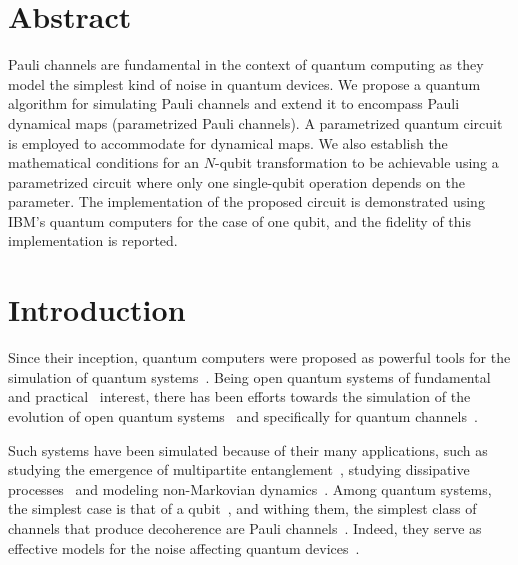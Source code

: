 \documentclass[10pt,letterpaper]{article} %
\begin{document}
\section*{Abstract}
Pauli channels are fundamental in the context of quantum computing as they
model the simplest kind of noise in quantum devices.  We propose a quantum
algorithm for simulating
Pauli channels 
and extend it to encompass Pauli dynamical maps 
(parametrized Pauli channels).
A parametrized quantum circuit is employed to accommodate for dynamical maps. 
We also establish the mathematical conditions for an
$N$-qubit transformation to be achievable using a parametrized circuit where
only one single-qubit operation depends on the parameter. 
The implementation of the proposed circuit is demonstrated using IBM's quantum computers 
for the case of one qubit, and the fidelity of this implementation is reported. 


\section{Introduction} %

Since their inception, quantum computers were proposed as powerful tools for
the simulation of quantum systems~\cite{feynman1982simulating}.  Being open
quantum systems of fundamental~\cite{Zur91,RevModPhys.76.1267} and
practical~\cite{breuer2007theory} interest, there has been efforts towards the
simulation of the evolution of open quantum systems~\cite{Garcia, Wang,Weimer}
and specifically for quantum channels~\cite{Xin,Wei,Zanetti}.

Such systems have been simulated because of their many applications, 
such as studying the emergence of multipartite entanglement~\cite{Andrea,Andrea_AD},
studying dissipative processes~\cite{Barreiro}
and modeling non-Markovian dynamics~\cite{Marsden}.
Among quantum systems, the simplest case is that of a qubit~\cite{chuangbook},
and withing them, the simplest class of channels that produce decoherence are
Pauli channels~\cite{geometry,Zbigniew,Davalos}. Indeed, they serve as
effective models for the noise affecting quantum devices~\cite{Flammia,Fawzi}.
\end{document}

